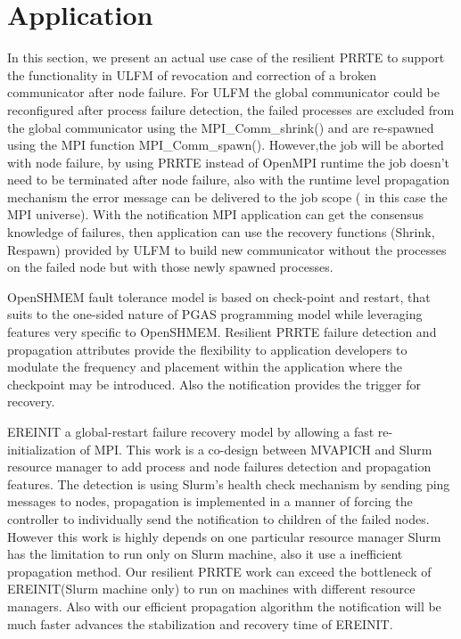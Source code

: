\documentclass[sigconf]{acmart}
\begin{document}
\section{Application}
In this section, we present an actual use case of the resilient PRRTE to support the functionality in ULFM of revocation and correction of a broken communicator after node failure. For ULFM the global communicator could be reconfigured after process failure detection, the failed processes are excluded from the global communicator using the MPI\_Comm\_shrink() and are re-spawned using the MPI function MPI\_Comm\_spawn(). However,the job will be aborted with node failure, by using PRRTE instead of OpenMPI runtime the job doesn't need to be terminated after node failure, also with the runtime level propagation mechanism the error message can be delivered to the job scope ( in this case the MPI universe). With the notification MPI application can get the consensus knowledge of failures, then application can use the recovery functions (Shrink, Respawn) provided by ULFM to build new communicator without the processes on the failed node but with those newly spawned processes. 

OpenSHMEM fault tolerance model is based on check-point and restart, that suits to the one-sided nature of PGAS programming model while leveraging features very specific to OpenSHMEM. Resilient PRRTE failure detection and propagation attributes provide the flexibility to application developers to modulate the frequency and placement within the application where the checkpoint may be introduced. Also the notification provides the trigger for recovery. 

EREINIT a global-restart failure recovery model by allowing a fast re-initialization of MPI. This work is a co-design between MVAPICH and Slurm resource manager to add process and node failures detection and propagation features. The detection is using Slurm's health check mechanism by sending ping messages to nodes, propagation is implemented in a manner of forcing the controller to individually send the notification to children of the failed nodes. However this work is highly depends on one particular resource manager Slurm has the limitation to run only on Slurm machine, also it use a inefficient propagation method. Our resilient PRRTE work can exceed the bottleneck of EREINIT(Slurm machine only) to run on machines with different resource managers. Also with our efficient propagation algorithm the notification will be much faster advances the stabilization and recovery time of EREINIT.
\end{document}
